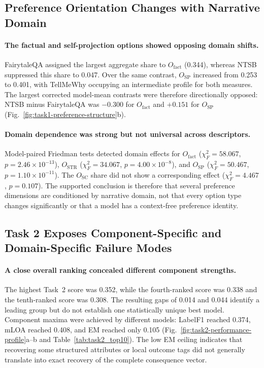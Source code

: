 \documentclass[pdflatex,sn-mathphys-num]{sn-jnl}%
\theoremstyle{thmstyleone}%
\theoremstyle{thmstyletwo}%
\theoremstyle{thmstylethree}%
\begin{document}
\subsection{Preference Orientation Changes with Narrative Domain}

\paragraph{The factual and self-projection options showed opposing domain shifts.}
FairytaleQA assigned the largest aggregate share to $O_{\mathrm{fact}}$ (0.344), whereas NTSB suppressed this share to 0.047. Over the same contrast, $O_{\mathrm{SP}}$ increased from 0.253 to 0.401, with TellMeWhy occupying an intermediate profile for both measures. The largest corrected model-mean contrasts were therefore directionally opposed: NTSB minus FairytaleQA was $-0.300$ for $O_{\mathrm{fact}}$ and $+0.151$ for $O_{\mathrm{SP}}$ (Fig.~\ref{fig:task1-preference-structure}b).

\paragraph{Domain dependence was strong but not universal across descriptors.}
Model-paired Friedman tests detected domain effects for $O_{\mathrm{fact}}$ ($\chi_F^2=58.067$, $p=2.46\times10^{-13}$), $O_{\mathrm{STR}}$ ($\chi_F^2=34.067$, $p=4.00\times10^{-8}$), and $O_{\mathrm{SP}}$ ($\chi_F^2=50.467$, $p=1.10\times10^{-11}$). The $O_{\mathrm{SC}}$ share did not show a corresponding effect ($\chi_F^2=4.467$, $p=0.107$). The supported conclusion is therefore that several preference dimensions are conditioned by narrative domain, not that every option type changes significantly or that a model has a context-free preference identity.

\subsection{Task 2 Exposes Component-Specific and Domain-Specific Failure Modes}

\paragraph{A close overall ranking concealed different component strengths.}
The highest Task~2 score was 0.352, while the fourth-ranked score was 0.338 and the tenth-ranked score was 0.308. The resulting gaps of 0.014 and 0.044 identify a leading group but do not establish one statistically unique best model. Component maxima were achieved by different models: LabelF1 reached 0.374, mLOA reached 0.408, and EM reached only 0.105 (Fig.~\ref{fig:task2-performance-profile}a--b and Table~\ref{tab:task2_top10}). The low EM ceiling indicates that recovering some structured attributes or local outcome tags did not generally translate into exact recovery of the complete consequence vector.
\end{document}
